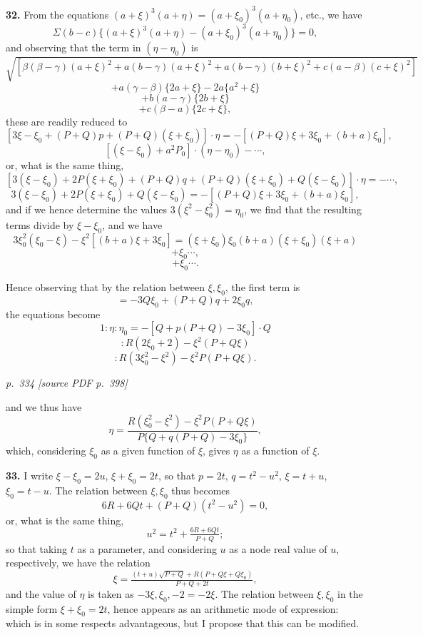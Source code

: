 \documentclass[11pt,a4paper]{article}
\newcommand{\pagemarker}[2]{\par\bigskip\noindent\textit{p.~#1 [source PDF p.~#2]}\par\smallskip}
\begin{document}
\textbf{32.} From the equations $(a + \xi)^3 (a + \eta) = (a + \xi_0)^3 (a + \eta_0)$, etc., we have
\[
\Sigma (b - c)\{(a + \xi)^3 (a + \eta) - (a + \xi_0)^3 (a + \eta_0)\} = 0,
\]
and observing that the term in $(\eta - \eta_0)$ is
\[
\sqrt{[\beta(\beta - \gamma)(a + \xi)^2 + a(b - \gamma)(a + \xi)^2 + a(b - \gamma)(b + \xi)^2 + c(a - \beta)(c + \xi)^2]}
\]
\[
+ a(\gamma - \beta)\{2a + \xi\} - 2a\{a^2 + \xi\}
\]
\[
+ b(a - \gamma)\{2b + \xi\}
\]
\[
+ c(\beta - a)\{2c + \xi\},
\]
these are readily reduced to
\[
[3\xi - \xi_0 + (P + Q)p + (P + Q)(\xi + \xi_0)] \cdot \eta = -[(P + Q)\xi + 3\xi_0 + (b + a)\xi_0],
\]
\[
[(\xi - \xi_0) + a^2 P_0]\cdot (\eta - \eta_0) - \cdots,
\]
or, what is the same thing,
\[
[3(\xi - \xi_0) + 2P(\xi + \xi_0) + (P + Q)q + (P + Q)(\xi + \xi_0) + Q(\xi - \xi_0)] \cdot \eta = -\cdots,
\]
\[
3(\xi - \xi_0) + 2P(\xi + \xi_0) + Q(\xi - \xi_0) = -[(P + Q)\xi + 3\xi_0 + (b + a)\xi_0],
\]
and if we hence determine the values $3(\xi^2 - \xi_0^2) = \eta_0$, we find that the resulting terms divide by $\xi - \xi_0$, and we have
\[
3\xi_0^2(\xi_0 - \xi) - \xi^2[(b + a)\xi + 3\xi_0] = (\xi + \xi_0)\xi_0(b + a)(\xi + \xi_0)(\xi + a)
\]
\[
+ \xi_0 \cdots,
\]
\[
+ \xi_0 \cdots.
\]

Hence observing that by the relation between $\xi, \xi_0$, the first term is
\[
= -3Q\xi_0 + (P + Q)q + 2\xi_0 q,
\]
the equations become
\[
1: \eta : \eta_0 = -[Q + p(P + Q) - 3\xi_0] \cdot Q
\]
\[
: R(2\xi_0 + 2) - \xi^2(P + Q\xi)
\]
\[
: R(3\xi_0^2 - \xi^2) - \xi^2 P(P + Q\xi).
\]

\clearpage

\pagemarker{334}{398}

and we thus have
\[
\eta = \frac{R(\xi_0^2 - \xi^2) - \xi^2 P(P + Q\xi)}{P\{Q + q(P + Q) - 3\xi_0\}},
\]
which, considering $\xi_0$ as a given function of $\xi$, gives $\eta$ as a function of $\xi$.

\textbf{33.} I write $\xi - \xi_0 = 2u$, $\xi + \xi_0 = 2t$, so that $p = 2t$, $q = t^2 - u^2$, $\xi = t + u$, $\xi_0 = t - u$. The relation between $\xi, \xi_0$ thus becomes
\[
6R + 6Qt + (P + Q)(t^2 - u^2) = 0,
\]
or, what is the same thing,
\[
u^2 = t^2 + \tfrac{6R + 6Qt}{P + Q};
\]
so that taking $t$ as a parameter, and considering $u$ as a node real value of $u$, respectively, we have the relation
\[
\xi = \tfrac{(t + u)\sqrt{P + Q} + R(P + Q\xi + Q\xi_0)}{P + Q + 2t},
\]
and the value of $\eta$ is taken as $-3\xi, \xi_0, -2 = -2\xi$. The relation between $\xi, \xi_0$ in the simple form $\xi + \xi_0 = 2t$, hence appears as an arithmetic mode of expression: which is in some respects advantageous, but I propose that this can be modified.
\end{document}
